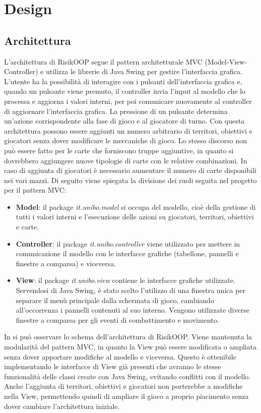 \documentclass[a4paper,12pt]{report}
\begin{document}
\chapter{Design}
%
\section{Architettura}
L'architettura di RisikOOP segue il pattern architetturale MVC (Model-View-Controller) e utilizza le librerie di Java Swing per gestire l'interfaccia grafica. L'utente ha la possibilit\`a di interagire con i pulsanti dell'interfaccia grafica e, quando un pulsante viene premuto, il controller invia l'input al modello che lo processa e aggiorna i valori interni, per poi comunicare nuovamente al controller di aggiornare l'interfaccia grafica. La pressione di un pulsante determina un'azione corrispondente alla fase di gioco e al giocatore di turno. Con questa architettura possono essere aggiunti un numero arbitrario di territori, obiettivi e giocatori senza dover modificare le meccaniche di gioco. Lo stesso discorso non pu\`o essere fatto per le carte che forniscono truppe aggiuntive, in quanto si dovrebbero aggiungere nuove tipologie di carte con le relative combinazioni. In caso di aggiunta di giocatori \`e necessario aumentare il numero di carte disponibili nei vari mazzi. Di seguito viene spiegata la divisione dei ruoli seguita nel progetto per il pattern MVC:
\begin{itemize}
    \item{\textbf{Model}:} il package \textit{it.unibo.model} si occupa del modello, cio\`e della gestione di tutti i valori interni e l'esecuzione delle azioni su giocatori, territori, obiettivi e carte.
    \item{\textbf{Controller}:} il package \textit{it.unibo.controller} viene utilizzato per mettere in comunicazione il modello con le interfacce grafiche (tabellone, pannelli e finestre a comparsa) e viceversa.
    \item{\textbf{View}:} il package \textit{it.unibo.view} contiene le interfacce grafiche utilizzate. Servendosi di Java Swing, \`e stato scelto l'utilizzo di una finestra unica per separare il men\`u principale dalla schermata di gioco, cambiando all'occorrenza i pannelli contenuti al suo interno. Vengono utilizzate diverse finestre a comparsa per gli eventi di combattimento e movimento.
\end{itemize}
In  si pu\`o osservare lo schema dell'architettura di RisikOOP. Viene mantenuta la modularit\`a del pattern MVC, in quanto la View pu\`o essere modificata o ampliata senza dover apportare modifiche al modello e viceversa. Questo \`e ottenibile implementando le interfacce di View gi\`a presenti che avranno le stesse funzionalit\`a delle classi create con Java Swing, evitando conflitti con il modello. Anche l'aggiunta di territori, obiettivi e giocatori non porterebbe a modifiche nella View, permettendo quindi di ampliare il gioco a proprio piacimento senza dover cambiare l'architettura iniziale.
\end{document}
